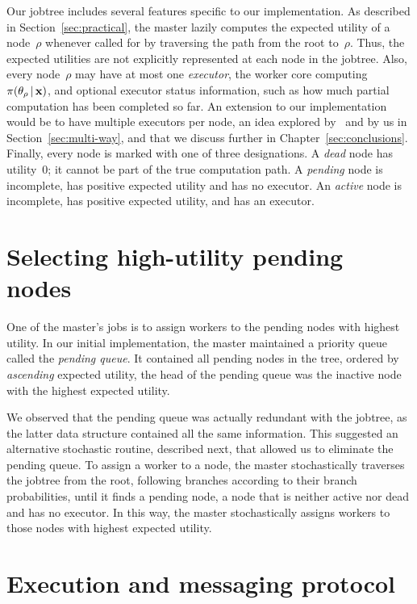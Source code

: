 \documentclass[angelino.tex]{subfiles}
\begin{document}
Our jobtree includes several features specific to our implementation.
As described in Section~\ref{sec:practical},
the master lazily computes the expected utility of a node~$\rho$
whenever called for by traversing the path from the root to~$\rho$.
Thus, the expected utilities are not explicitly represented at each node in the jobtree.
%
Also, every node~$\rho$ may have at most one \emph{executor}, \ie the worker
core computing~$\pi(\theta_\rho \,|\, \mathbf{x})$, and optional executor status
information, such as how much partial computation has been completed so far.
An extension to our implementation would be to have multiple executors per node,
an idea explored by~\citet{strid-2010-prefetching} and by us in
Section~\ref{sec:multi-way},
and that we discuss further in Chapter~\ref{sec:conclusions}.
%
Finally, every node is marked with one of three designations.
A \emph{dead} node has utility~0; it cannot be part of the true computation path. 
A \emph{pending} node is incomplete, has positive expected utility and has no executor.
An \emph{active} node is incomplete, has positive expected utility, and has an executor.


\section{Selecting high-utility pending nodes}
\label{sec:highest-utility-pending}

One of the master's jobs is to assign workers to the pending nodes with highest
utility.
%
In our initial implementation, the master maintained a priority queue
called the \emph{pending queue}.
%
It contained all pending nodes in the tree, ordered by \emph{ascending} expected
utility, \ie the head of the pending queue was the inactive node with the
highest expected utility.

We observed that the pending queue was actually redundant with the jobtree,
as the latter data structure contained all the same information.
%
This suggested an alternative stochastic routine, described next,
that allowed us to eliminate the pending queue.
%
To assign a worker to a node, the master stochastically traverses the
jobtree from the root, following branches according to their branch
probabilities, until it finds a pending node, \ie a node that is neither active
nor dead and has no executor.
%
In this way, the master stochastically assigns workers to those nodes with
highest expected utility.

\section{Execution and messaging protocol}
\label{sec:execution}
\end{document}
